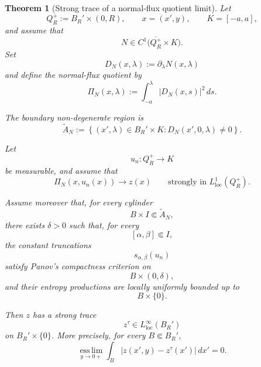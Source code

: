 \documentclass[10pt,a4paper]{amsart}
\newtheorem{theorem}{Theorem}
\begin{document}
\begin{theorem}[Strong trace of a normal-flux quotient limit]
\label{thm:strong-trace-normal-flux-quotient}
Let
\[
    Q_R^+
    :=
    B_R'\times(0,R),
    \qquad
    x=(x',y),
    \qquad
    K=[-a,a],
\]
and assume that
\[
    N\in C^1\bigl(\overline{Q_R^+}\times K\bigr).
\]
Set
\[
    D_N(x,\lambda)
    :=
    \partial_\lambda N(x,\lambda)
\]
and define the normal-flux quotient by
\begin{equation}
\label{eq:normal-flux-quotient-trace-theorem}
    \Pi_N(x,\lambda)
    :=
    \int_{-a}^{\lambda}
        |D_N(x,s)|^2\,ds.
\end{equation}

The boundary non-degenerate region is
\begin{equation}
\label{eq:boundary-normal-nondegenerate-region}
    \widetilde A_N
    :=
    \left\{
        (x',\lambda)\in B_R'\times K:
        D_N(x',0,\lambda)\neq0
    \right\}.
\end{equation}

Let
\[
    u_n:Q_R^+\to K
\]
be measurable, and assume that
\begin{equation}
\label{eq:normal-quotient-interior-limit}
    \Pi_N(x,u_n(x))
    \longrightarrow z(x)
    \qquad
    \text{strongly in }L^1_{\mathrm{loc}}(Q_R^+).
\end{equation}

Assume moreover that, for every cylinder
\[
    B\times I\Subset\widetilde A_N,
\]
there exists \(\delta>0\) such that, for every
\[
    [\alpha,\beta]\Subset I,
\]
the constant truncations
\[
    s_{\alpha,\beta}(u_n)
\]
satisfy Panov's compactness criterion on
\[
    B\times(0,\delta),
\]
and their entropy productions are locally uniformly bounded up to
\[
    B\times\{0\}.
\]

Then \(z\) has a strong trace
\[
    z^\tau\in L^\infty_{\mathrm{loc}}(B_R')
\]
on \(B_R'\times\{0\}\).  More precisely, for every
\(B\Subset B_R'\),
\begin{equation}
\label{eq:normal-quotient-strong-trace}
    \operatorname*{ess\,lim}_{y\to0+}
    \int_B
        |z(x',y)-z^\tau(x')|\,dx'
    =0.
\end{equation}
\end{theorem}
\end{document}
